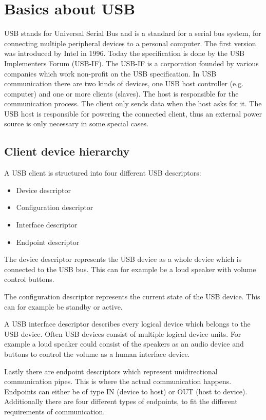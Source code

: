 \chapter{Basics about USB}

USB stands for Universal Serial Bus and is a standard for a serial bus system, for connecting multiple peripheral devices to a personal computer. The first version was introduced by Intel in 1996. Today the specification is done by the USB Implementers Forum (USB-IF). The USB-IF is a corporation founded by various companies which work non-profit on the USB specification. In USB communication there are two kinds of devices, one USB host controller (e.g. computer) and one or more clients (slaves). The host is responsible for the communication process. The client only sends data when the host asks for it. The USB host is responsible for powering the connected client, thus an external power source is only necessary in some special cases\cite{wiki_usb}.

\section{Client device hierarchy}

A USB client is structured into four different USB descriptors:

\begin{itemize}
\item Device descriptor
\item Configuration descriptor
\item Interface descriptor
\item Endpoint descriptor
\end{itemize}

The device descriptor represents the USB device as a whole device which is connected to the USB bus. This can for example be a loud speaker with volume control buttons.

The configuration descriptor represents the current state of the USB device. This can for example be standby or active.

A USB interface descriptor describes every logical device which belongs to the USB device. Often USB devices consist of multiple logical device units. For example a loud speaker could consist of the speakers as an audio device and buttons to control the volume as a human interface device. 

Lastly there are endpoint descriptors which represent unidirectional communication pipes. This is where the actual communication happens. Endpoints can either be of type IN (device to host) or OUT (host to device). Additionally there are four different types of endpoints, to fit the different requirements of communication\cite{free_usb}.

